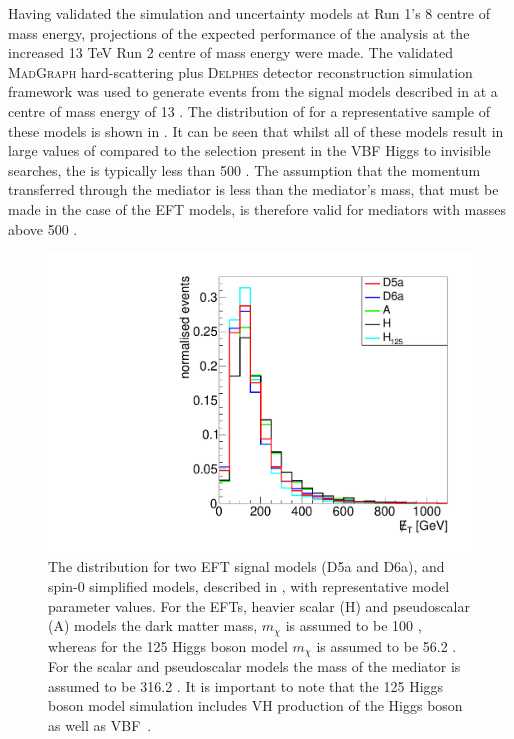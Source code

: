 Having validated the simulation and uncertainty models at Run 1's 8 \TeV centre of mass energy, projections of the expected performance of the analysis at the increased 13 TeV Run 2 centre of mass energy were made. The validated \textsc{MadGraph} hard-scattering plus \textsc{Delphes} detector reconstruction simulation framework was used to generate events from the signal models described in  at a centre of mass energy of 13 \TeV. The distribution of \MET for a representative sample of these models is shown in . It can be seen that whilst all of these models result in large values of \MET compared to the selection present in the \ac{VBF} Higgs to invisible searches, the \MET is typically less than 500 \GeV. The assumption that the momentum transferred through the mediator is less than the mediator's mass, that must be made in the case of the \ac{EFT} models, is therefore valid for mediators with masses above 500 \GeV.

\begin{figure}
  \includegraphics[width=\largefigwidth]{plots/interp/modelmet.pdf}
  \caption{The \MET distribution for two \ac{EFT} signal models (D5a and D6a), and spin-0 simplified models, described in , with representative model parameter values. For the \ac{EFT}s, heavier scalar (H) and pseudoscalar (A) models the dark matter mass, $m_{\chi}$ is assumed to be 100 \GeV, whereas for the 125 \GeV Higgs boson model $m_{\chi}$ is assumed to be 56.2 \GeV. For the scalar and pseudoscalar models the mass of the mediator is assumed to be 316.2 \GeV. It is important to note that the 125 \GeV Higgs boson model simulation includes \ac{VH} production of the Higgs boson as well as \ac{VBF}~\cite{ourdmpaper}.}
  \label{fig:dmmodelkinematics}
\end{figure}

